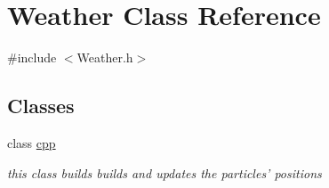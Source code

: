 \hypertarget{classWeather}{
\section{Weather Class Reference}
\label{classWeather}
}


{\ttfamily \#include $<$Weather.h$>$}\subsection*{Classes}
\begin{DoxyCompactItemize}
\item 
class \hyperlink{classWeather_1_1cpp}{cpp}
\begin{DoxyCompactList}\small\item\em this class builds builds and updates the particles' positions \item\end{DoxyCompactList}\end{DoxyCompactItemize}
